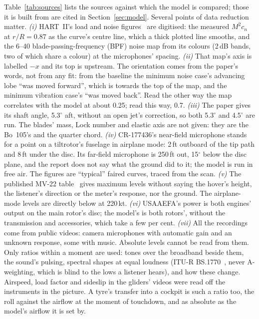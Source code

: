 \documentclass[10pt,a4paper,twocolumn]{article}
\begin{document}
Table~\ref{tab:sources} lists the sources against which the model is compared; those it is built from are cited in Section~\ref{sec:model}. Several points of data reduction matter.
\emph{(i)} HART~II's load and noise figures~\cite{lim} are digitised: the measured $M^2c_n$ at $r/R=0.87$ as the curve's centre line, which a thick plotted line smooths, and the 6--40 blade-passing-frequency (BPF) noise map from its colours (2\,dB bands, two of which share a colour) at the microphones' spacing.
\emph{(ii)} That map's axis is labelled $-x$ and its top is upstream. The orientation comes from the paper's words, not from any fit: from the baseline the minimum noise case's advancing lobe ``was moved forward'', which is towards the top of the map, and the minimum vibration case's ``was moved back''. Read the other way the map correlates with the model at about 0.25; read this way, 0.7.
\emph{(iii)} The paper gives its shaft angle, 5.3$^\circ$ aft, without an open jet's correction, so both 5.3$^\circ$ and 4.5$^\circ$ are run. The blades' mass, Lock number and elastic axis are not given: they are the Bo~105's and the quarter chord.
\emph{(iv)} CR-177436's near-field microphone stands for a point on a tiltrotor's fuselage in airplane mode: 2\,ft outboard of the tip path and 8\,ft under the disc. Its far-field microphone is 250\,ft out, 15$^\circ$ below the disc plane, and the report does not say what the ground did to it; the model is run in free air. The figures are ``typical'' faired curves, traced from the scan.
\emph{(v)} The published MV-22 table~\cite{mod} gives maximum levels without saying the hover's height, the listener's direction or the meter's response, nor the ground. The airplane-mode levels are directly below at 220\,kt.
\emph{(vi)} USAAEFA's power is both engines' output on the main rotor's disc; the model's is both rotors', without the transmission and accessories, which take a few per cent.
\emph{(vii)} All the recordings come from public videos: camera microphones with automatic gain and an unknown response, some with music. Absolute levels cannot be read from them. Only ratios within a moment are used: tones over the broadband beside them, the sound's pulsing, spectral shapes at equal loudness (ITU-R BS.1770~\cite{bs1770}, never A-weighting, which is blind to the lows a listener hears), and how these change. Airspeed, load factor and sideslip in the gliders' videos were read off the instruments in the picture. A tyre's transfer into a cockpit is such a ratio too, the roll against the airflow at the moment of touchdown, and as absolute as the model's airflow it is set by.
\end{document}
